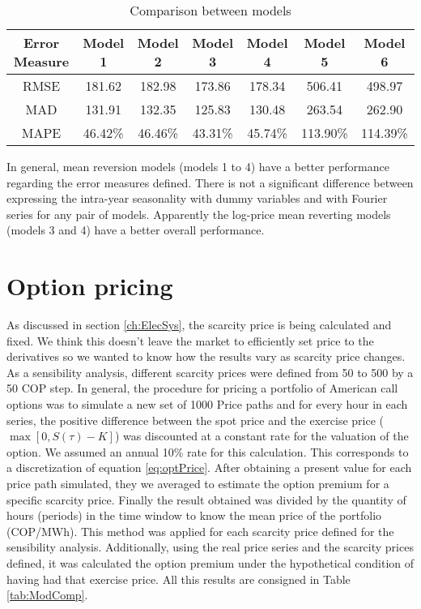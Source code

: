 \documentclass[3p]{elsarticle}
\begin{document}
\begin{table}[!h]
\centering
\begin{tabular}{c|cccccc}
Error Measure & Model 1 & Model 2 & Model 3 & Model 4 & Model 5  & Model 6  \\ \hline
RMSE          & 181.62  & 182.98  & 173.86  & 178.34  & 506.41   & 498.97   \\
MAD           & 131.91  & 132.35  & 125.83  & 130.48  & 263.54   & 262.90   \\
MAPE          & 46.42\% & 46.46\% & 43.31\% & 45.74\% & 113.90\% & 114.39\%
\end{tabular}
\caption{Comparison between models}
\label{tab:comp}
\end{table}

In general, mean reversion models (models 1 to 4) have a better performance regarding the error measures defined. There is not a significant difference between expressing the intra-year seasonality with dummy variables and with Fourier series for any pair of models. Apparently the log-price mean reverting models (models 3 and 4) have a better overall performance.

\section{Option pricing}\label{ch:OPPric}
As discussed in section \ref{ch:ElecSys}, the scarcity price is being calculated and fixed. We think this doesn't leave the market to efficiently set price to the derivatives so we wanted to know how the results vary as scarcity price changes. As a sensibility analysis, different scarcity prices were defined from 50 to 500 by a 50 COP step.
In general, the procedure for pricing a portfolio of American call options was to simulate a new set of 1000 Price paths and for every hour in each series, the positive difference between the spot price and the exercise price ($\max[0,S(\tau)-K]$) was discounted at a constant rate for the valuation of the option. We assumed an annual 10\% rate for this calculation. This corresponds to a discretization of equation \ref{eq:optPrice}. After obtaining a present value for each price path simulated, they we averaged to estimate the option
premium for a specific scarcity price. Finally the result obtained was divided by the quantity of hours (periods) in the time window to know the mean price of the portfolio (COP/MWh). This method was applied for each scarcity price defined for the sensibility analysis. Additionally, using the real price series and the scarcity prices defined, it was calculated the option premium under the hypothetical condition of having had that exercise price. All this results are consigned in Table \ref{tab:ModComp}.
\end{document}
